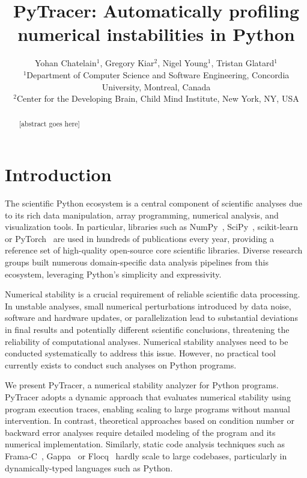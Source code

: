 \documentclass[11pt]{article}
\begin{document}
\makeatletter
\let\orig@lstnumber=\thelstnumber
\newcommand\lstsetnumber[1]{\gdef\thelstnumber{#1}}
\newcommand\lstresetnumber{\global\let\thelstnumber=\orig@lstnumber}
\makeatother

\title{PyTracer: Automatically profiling numerical instabilities in Python}
\author{Yohan Chatelain$^1$, Gregory Kiar$^2$, Nigel Young$^1$, Tristan Glatard$^1$\\
$^1$Department of Computer Science and Software Engineering, Concordia University, Montreal, Canada\\
$^2$Center for the Developing Brain, Child Mind Institute, New York, NY, USA}
\date{}
\maketitle

\begin{abstract}
[abstract goes here]
\end{abstract}

\section{Introduction}

The scientific Python ecosystem is a central component of scientific
analyses due to its rich data manipulation, array programming,
numerical analysis, and visualization tools. In particular, libraries such
as NumPy~\cite{harris2020array}, SciPy~\cite{virtanen2020scipy}, scikit-learn~\cite{pedregosa2011scikit} or PyTorch~\cite{paszke2019pytorch} are used in hundreds of publications every year, providing a reference set of high-quality open-source core scientific libraries. Diverse research groups built numerous domain-specific data analysis pipelines from this ecosystem, leveraging Python's simplicity and expressivity. 

Numerical stability is a crucial requirement of reliable scientific data
processing. In unstable analyses, small numerical perturbations introduced by data noise, software and hardware updates, or parallelization lead to substantial deviations in final results and potentially different scientific conclusions, threatening the reliability of computational analyses. Numerical stability analyses need to be conducted systematically to address this issue. However, no practical tool currently exists to conduct such analyses on Python programs.

We present PyTracer, a numerical stability analyzer for Python programs.
PyTracer adopts a dynamic approach that evaluates numerical stability using program execution traces, enabling scaling to large programs without manual intervention. In contrast, theoretical approaches based on condition number or backward error analyses require detailed modeling of the program and its numerical implementation. Similarly, static code analysis techniques such as Frama-C~\cite{cuoq2012frama}, Gappa~\cite{de2010certifying} or Flocq~\cite{boldo2011flocq} hardly scale to large codebases, particularly in dynamically-typed languages such as Python.
\end{document}

